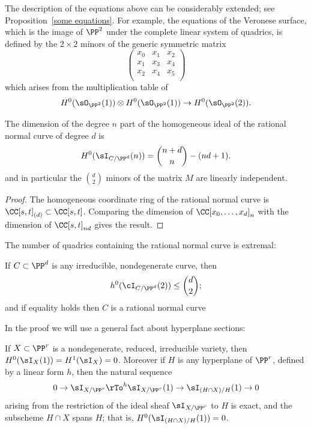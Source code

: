 \begin{fact}\label{Veronese equations fact}
 The description of the equations above can be considerably extended; see Proposition~\ref{some equations}. For example, the equations of the Veronese surface, which is the image of $\PP^{2}$
 under the complete linear system of quadrics, is defined by the $2\times 2$ minors of the generic
 symmetric matrix 
 $$
 \begin{pmatrix}
 x_{0}&x_{1}&x_{2}\\
  x_{1}&x_{3}&x_{4}\\
   x_{2}&x_{4}&x_{5}\\
\end{pmatrix}
$$
which arises from the multiplication table of 
$$
H^{0}(\sO_{\PP^{2}}(1)) \otimes H^{0}(\sO_{\PP^{2}}(1)) \to H^{0}(\sO_{\PP^{2}}(2)).
$$
\end{fact}

\begin{corollary}\label{forms vanishing on the RNC}
The dimension of the degree $n$ part of the homogeneous ideal of the rational normal curve of degree $d$ is
$$
H^0(\sI_{C/\PP^d}(n)) = \binom{n+d}{n} - (nd+1).
$$
and in particular the $\binom{d}{ 2}$ minors of the matrix $M$ are linearly independent.
\end{corollary}

\begin{proof}
The homogeneous coordinate ring of the rational normal curve is $\CC[s,t]_{(d)}\subset \CC[s,t]$. Comparing the dimension
of $\CC[x_0,\dots,x_d]_n$ with the dimension of $\CC[s,t]_{nd}$ gives the result.
\end{proof}

The number of quadrics containing the rational normal curve is extremal:

\begin{proposition}\label{rnc on most quadrics}
If $C \subset \PP^d$ is any irreducible, nondegenerate curve, then
$$
h^0(\cI_{C/\PP^d}(2)) \leq  \binom{d}{2};
$$
and if equality holds then $C$ is a rational normal curve
\end{proposition}

In the proof we will use a general fact about hyperplane sections:

\begin{proposition}\label{arbitrary hyperplane}
If $X\subset \PP^r$ is a nondegenerate, reduced, irreducible variety, 
then $H^0(\sI_X(1)) = H^1 (\sI_X) = 0$. Moreover if $H$ is any hyperplane of $\PP^r$, defined by
a linear form $h$, then the natural
sequence
$$
0\to \sI_{X/\PP^r} \rTo^h \sI_{X/\PP^r}(1)\to \sI_{(H\cap X)/H}(1)\to 0
$$
arising from the restriction of the ideal sheaf $\sI_{X/\PP^r}$ to $H$ is exact, and the subscheme
$H\cap X$ spans $H$; that is, $H^0(\sI_{(H\cap X)/H}(1)) = 0$.
\end{proposition}

